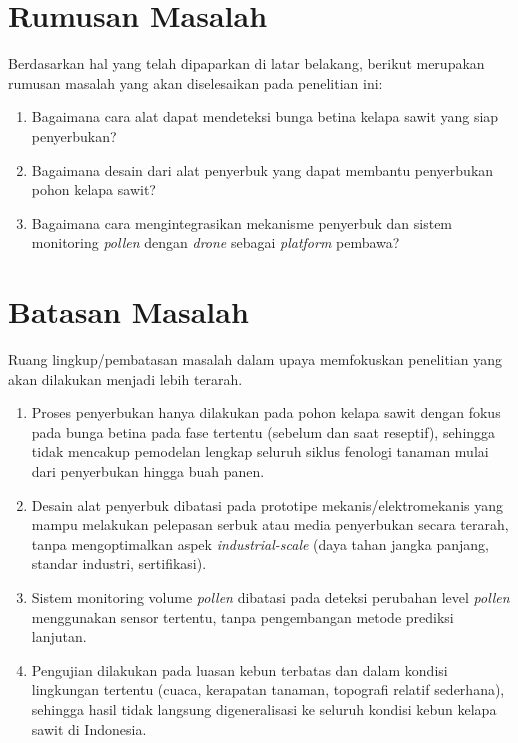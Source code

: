 \section{Rumusan Masalah}
\label{sec:rumusan-masalah}

Berdasarkan hal yang telah dipaparkan di latar belakang, berikut merupakan rumusan
masalah yang akan diselesaikan pada penelitian ini:
\begin{enumerate}
    \item Bagaimana cara alat dapat mendeteksi bunga betina kelapa sawit yang siap penyerbukan?
    \item Bagaimana desain dari alat penyerbuk yang dapat membantu penyerbukan pohon kelapa sawit?
    \item Bagaimana cara mengintegrasikan mekanisme penyerbuk dan sistem monitoring \emph{pollen} dengan \emph{drone} sebagai \emph{platform} pembawa?
\end{enumerate}

\section{Batasan Masalah}
\label{sec:batasan-masalah}

Ruang lingkup/pembatasan masalah dalam upaya memfokuskan penelitian yang akan
dilakukan menjadi lebih terarah.
\begin{enumerate}
  \item Proses penyerbukan hanya dilakukan pada pohon kelapa sawit dengan fokus pada bunga betina pada fase tertentu (sebelum dan saat reseptif), sehingga tidak mencakup pemodelan lengkap seluruh siklus fenologi tanaman mulai dari penyerbukan hingga buah panen.
  \item Desain alat penyerbuk dibatasi pada prototipe mekanis/elektromekanis yang mampu melakukan pelepasan serbuk atau media penyerbukan secara terarah, tanpa mengoptimalkan aspek \emph{industrial-scale} (daya tahan jangka panjang, standar industri, sertifikasi).
  \item Sistem monitoring volume \emph{pollen} dibatasi pada deteksi perubahan level \emph{pollen} menggunakan sensor tertentu, tanpa pengembangan metode prediksi lanjutan.
  \item Pengujian dilakukan pada luasan kebun terbatas dan dalam kondisi lingkungan tertentu (cuaca, kerapatan tanaman, topografi relatif sederhana), sehingga hasil tidak langsung digeneralisasi ke seluruh kondisi kebun kelapa sawit di Indonesia.
\end{enumerate}

